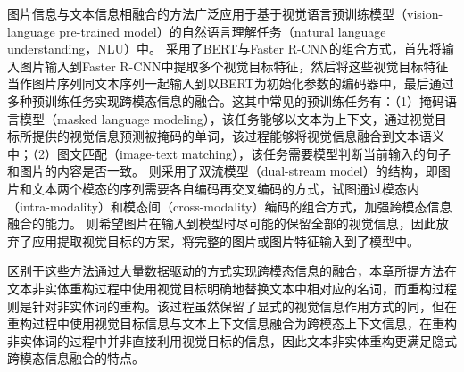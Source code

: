 图片信息与文本信息相融合的方法广泛应用于基于视觉语言预训练模型（vision-language pre-trained model）的自然语言理解任务（natural language understanding，NLU）中。
采用了BERT与Faster R-CNN的组合方式，首先将输入图片输入到Faster R-CNN中提取多个视觉目标特征，然后将这些视觉目标特征当作图片序列同文本序列一起输入到以BERT为初始化参数的编码器中，最后通过多种预训练任务实现跨模态信息的融合。这其中常见的预训练任务有：（1）掩码语言模型（masked language modeling），该任务能够以文本为上下文，通过视觉目标所提供的视觉信息预测被掩码的单词，该过程能够将视觉信息融合到文本语义中；（2）图文匹配（image-text matching），该任务需要模型判断当前输入的句子和图片的内容是否一致。
则采用了双流模型（dual-stream model）的结构，即图片和文本两个模态的序列需要各自编码再交叉编码的方式，试图通过模态内（intra-modality）和模态间（cross-modality）编码的组合方式，加强跨模态信息融合的能力。
则希望图片在输入到模型时尽可能的保留全部的视觉信息，因此放弃了应用提取视觉目标的方案，将完整的图片或图片特征输入到了模型中。

区别于这些方法通过大量数据驱动的方式实现跨模态信息的融合，本章所提方法在文本非实体重构过程中使用视觉目标明确地替换文本中相对应的名词，而重构过程则是针对非实体词的重构。该过程虽然保留了显式的视觉信息作用方式的同，但在重构过程中使用视觉目标信息与文本上下文信息融合为跨模态上下文信息，在重构非实体词的过程中并非直接利用视觉目标的信息，因此文本非实体重构更满足隐式跨模态信息融合的特点。






